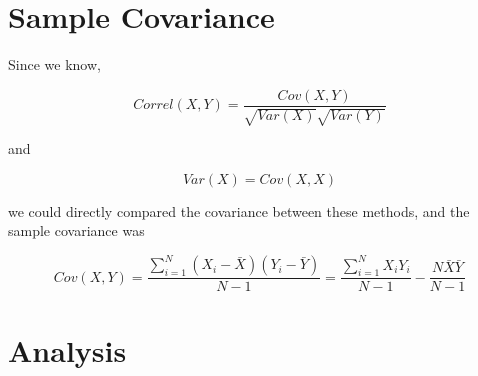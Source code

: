 \documentclass{article}[a4]
\begin{document}
\section{Sample Covariance}
Since we know, \par 
$$
Correl(X,Y) = \dfrac{Cov(X,Y)}{\sqrt{Var(X)}\sqrt{Var(Y)}}
$$\par 
and\par 
$$
Var(X) = Cov(X,X)
$$\par 
we could directly compared the covariance between these methods, and the sample covariance was \par 
\begin{equation}
Cov(X,Y) = \dfrac{\sum^{N}_{i=1}(X_{i}-\bar{X})(Y_{i}-\bar{Y})}{N-1}=\dfrac{\sum^{N}_{i=1}X_{i}Y_{i}}{N-1} - \dfrac{N\bar{X}\bar{Y}}{N-1}
\end{equation}
\section{Analysis}
\end{document}
